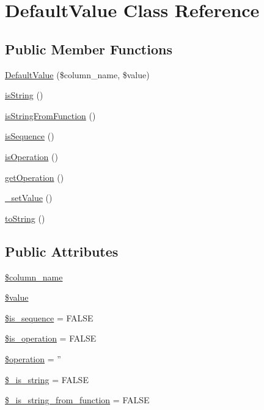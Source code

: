 \hypertarget{classDefaultValue}{\section{Default\+Value Class Reference}
\label{classDefaultValue}
}
\subsection*{Public Member Functions}
\begin{DoxyCompactItemize}
\item 
\hyperlink{classDefaultValue_a738994d0f9563b86310d85ede30c2fc7}{Default\+Value} (\$column\+\_\+name, \$value)
\item 
\hyperlink{classDefaultValue_a2ff17e887cf955aea26fbb1b3e11f491}{is\+String} ()
\item 
\hyperlink{classDefaultValue_aeef8c65be1e3cfe7459916653d6d9181}{is\+String\+From\+Function} ()
\item 
\hyperlink{classDefaultValue_a5186ba40cadb8a1740edd64665f4c126}{is\+Sequence} ()
\item 
\hyperlink{classDefaultValue_af7a051370a3b8bb17d9f9cf64a03be74}{is\+Operation} ()
\item 
\hyperlink{classDefaultValue_a1e607abe2e29a00fa3ab0cecba406776}{get\+Operation} ()
\item 
\hyperlink{classDefaultValue_a1a0d50d43f32dbb3df7e11467c6938be}{\+\_\+set\+Value} ()
\item 
\hyperlink{classDefaultValue_a0f0d4d1cc64b3bfb8d2acec2b113be4d}{to\+String} ()
\end{DoxyCompactItemize}
\subsection*{Public Attributes}
\begin{DoxyCompactItemize}
\item 
\hyperlink{classDefaultValue_a671e32e797e9975b6497a56a5ba92dc6}{\$column\+\_\+name}
\item 
\hyperlink{classDefaultValue_a963ea764e6dfb5dbfe87c4b8ffd131ac}{\$value}
\item 
\hyperlink{classDefaultValue_a7ad2c3e04c79053b6299c0fa0e35389e}{\$is\+\_\+sequence} = F\+A\+L\+S\+E
\item 
\hyperlink{classDefaultValue_ae01855465814b8be26de7bd0b33b6778}{\$is\+\_\+operation} = F\+A\+L\+S\+E
\item 
\hyperlink{classDefaultValue_a0b0e52103637bbb5ea0fdedcb0672fcd}{\$operation} = ''
\item 
\hyperlink{classDefaultValue_ac3b23483d015be5b48517fb96890b64a}{\$\+\_\+is\+\_\+string} = F\+A\+L\+S\+E
\item 
\hyperlink{classDefaultValue_a000cf284b962d5c3354abd73b611c888}{\$\+\_\+is\+\_\+string\+\_\+from\+\_\+function} = F\+A\+L\+S\+E
\end{DoxyCompactItemize}


